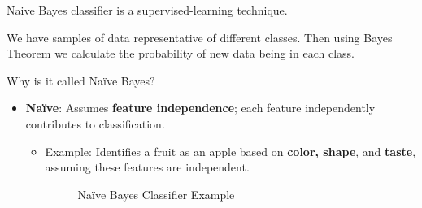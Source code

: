 %
%
%





{
	Naive Bayes classifier  is a supervised-learning technique.
	
	\medskip
	
	We have samples of  data representative of different classes. Then using Bayes Theorem we calculate the probability of new data being in each class.
	
}

\begin{frame}{Why is it called Naïve Bayes?}
	
	\begin{itemize}
		\item \textbf{Naïve}: Assumes \textbf{feature independence}; each feature independently contributes to classification.
		\begin{itemize}
			\item Example: Identifies a fruit as an apple based on \textbf{color, shape}, and \textbf{taste}, assuming these features are independent.
			
			\begin{figure}
				\centering
				\caption{Naïve Bayes Classifier Example}
				\label{fig:Naïve Bayes Classifier Example}
			\end{figure}
		\end{itemize}
	\end{itemize}
\end{frame}

